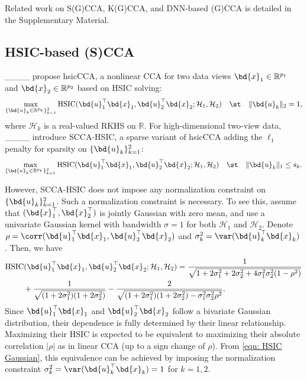 Related work on S(G)CCA, K(G)CCA, and DNN-based (G)CCA is detailed in the Supplementary Material.


\subsection{HSIC-based (S)CCA}\label{sec: SCCA-HSIC}
____
propose hsicCCA, a nonlinear  CCA
for two data views $\bd{x}_1\in \mathbb{R}^{p_1}$ and $\bd{x}_2\in \mathbb{R}^{p_2}$
based on HSIC solving:
\[
       \max_{\{\bd{u}_k\in \mathbb{R}^{p_k}\}_{k=1}^2}        
     \mathrm{HSIC}(\bd{u}_1^\top\bd{x}_1,\bd{u}_2^\top\bd{x}_2;\mathcal{H}_1,\mathcal{H}_2)
 \quad \st  \quad \| \bd{u}_k\|_2=1,
\]
where 
 $\mathcal{H}_k$ is 
a real-valued RKHS on $\mathbb{R}$.
For high-dimensional two-view data,
____
introduce SCCA-HSIC, a sparse variant of hsicCCA adding
the $\ell_1$ penalty 
for sparsity on $\{\bd{u}_k\}_{k=1}^2$:
\[
       \max_{\{\bd{u}_k\in \mathbb{R}^{p_k}\}_{k=1}^2}        
     \mathrm{HSIC}(\bd{u}_1^\top\bd{x}_1,\bd{u}_2^\top\bd{x}_2;\mathcal{H}_1,\mathcal{H}_2)
 \quad \st  \quad \| \bd{u}_k\|_1\le s_k.
\]

However, SCCA-HSIC does not impose any normalization constraint
on $\{\bd{u}_k\}_{k=1}^2$. Such
a normalization constraint
is 
necessary. To see this,
assume that $(\bd{x}_1^\top,\bd{x}_2^\top)$ is jointly Gaussian with zero mean, and
use a univariate Gaussian kernel with bandwidth $\sigma=1$ for both $\mathcal{H}_1$ and $\mathcal{H}_2$.
Denote $\rho=\corr(\bd{u}_1^\top\bd{x}_1, \bd{u}_2^\top\bd{x}_2)$
and $\sigma_k^2=\var(\bd{u}_k^\top\bd{x}_k)$.
Then, we have
\begin{align}\label{eqn: HSIC Gaussian}
    & \mathrm{HSIC}(\bd{u}_1^\top\bd{x}_1,\bd{u}_2^\top\bd{x}_2;\mathcal{H}_1,\mathcal{H}_2)
     =\frac{1}{\sqrt{1+2\sigma_1^2+2\sigma_2^2+4\sigma_1^2\sigma_2^2(1-\rho^2)}}\nonumber\\
    &~\qquad+\frac{1}{\sqrt{(1+2\sigma_1^2)(1+2\sigma_2^2)}}
    -\frac{2}{\sqrt{(1+2\sigma_1^2)(1+2\sigma_2^2)-\sigma_1^2\sigma_2^2\rho^2}}.
\vspace{-0.5cm}\end{align}
Since $\bd{u}_1^\top\bd{x}_1$ and $\bd{u}_2^\top\bd{x}_2$ 
follow a bivariate Gaussian distribution,
their dependence is fully determined by their linear relationship.
Maximizing their
 HSIC is expected to be equivalent to
 maximizing their absolute correlation $|\rho|$ as in  linear CCA (up to a sign change of $\rho$).
 From \eqref{eqn: HSIC Gaussian},
this equivalence can be achieved by 
imposing the normalization constraint $\sigma_k^2=\var(\bd{u}_k^\top\bd{x}_k)=1$ for $k=1,2$.






